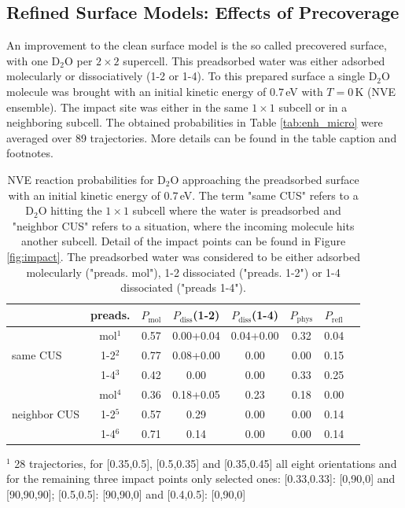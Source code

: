 \documentclass[11pt,DIV=13,BCOR=5mm,a4paper,headinclude]{scrbook}
\begin{document}
\subsection{Refined Surface Models: Effects of Precoverage}
An improvement to the clean surface model is the so called precovered surface, with one D$_2$O per $2\times 2$ supercell.
This preadsorbed water was either adsorbed molecularly or dissociatively (1-2 or 1-4).
To this prepared surface a single D$_2$O molecule was brought with an initial kinetic energy of $0.7\,$eV with $T=0\,$K  (NVE ensemble).
The impact site was either in the same $1\times 1$ subcell or in a neighboring subcell.
The obtained probabilities in Table \ref{tab:enh_micro} were averaged over 89 trajectories.
More details can be found in the table caption and footnotes.
\\
\begin{table}[hbt]
 \centering
  \caption{NVE reaction probabilities for D$_2$O approaching the preadsorbed surface with an initial kinetic energy of $0.7\,$eV.
The term "same CUS" refers to a D$_2$O hitting the $1\times 1$ subcell where the water is preadsorbed and "neighbor CUS" refers to a situation, where the incoming molecule hits another subcell.
Detail of the impact points can be found in Figure \ref{fig:impact}.
The preadsorbed water was considered to be either adsorbed molecularly ("preads. mol"), 1-2 dissociated ("preads. 1-2") or 1-4 dissociated ("preads 1-4").}
 \begin{tabular}{l|c|cccccc}
\toprule
& preads. &$P_\textrm{mol}$ & $P_\textrm{diss}$(1-2) &  $P_\textrm{diss}$(1-4) & $P_\textrm{phys}$ & $P_\textrm{refl}$ \\\midrule
\multirow{3}{*}{same CUS}& mol$^1$ &0.57 &0.00+0.04 &0.04+0.00  &0.32 &0.04 \\
& 1-2$^2$ &0.77 &0.08+0.00 &0.00 &0.00 &0.15 \\
& 1-4$^3$ &0.42 &0.00 &0.00 &0.33 &0.25 \\\hline
\multirow{3}{*}{neighbor CUS}& mol$^4$ &0.36 &0.18+0.05 &0.23 &0.18 & 0.00  \\
& 1-2$^5$ &0.57 &0.29 & 0.00  &0.00 &0.14 \\
& 1-4$^6$ &0.71 &0.14 &0.00 & 0.00 & 0.14 \\\bottomrule
\end{tabular}
\begin{tablenotes}
 \footnotesize
\item[] $^1$ 28 trajectories, for [0.35,0.5], [0.5,0.35] and [0.35,0.45] all eight orientations and for the remaining three impact points only selected ones: [0.33,0.33]: [0,90,0] and [90,90,90]; [0.5,0.5]: [90,90,0] and [0.4,0.5]: [0,90,0]

\end{tablenotes}
\end{table}
\end{document}
